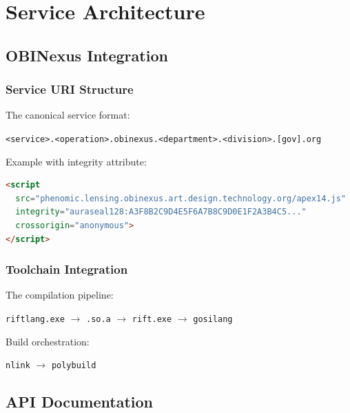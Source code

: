 \documentclass[12pt,a4paper]{report}
\theoremstyle{definition}
\begin{document}

\part{Service Architecture}

\chapter{OBINexus Integration}

\section{Service URI Structure}

The canonical service format:

\begin{center}
\texttt{<service>.<operation>.obinexus.<department>.<division>.[gov].org}
\end{center}

Example with integrity attribute:

\begin{lstlisting}[language=HTML, caption=Service Integration]
<script 
  src="phenomic.lensing.obinexus.art.design.technology.org/apex14.js"
  integrity="auraseal128:A3F8B2C9D4E5F6A7B8C9D0E1F2A3B4C5..."
  crossorigin="anonymous">
</script>
\end{lstlisting}

\section{Toolchain Integration}

The compilation pipeline:

\begin{center}
\texttt{riftlang.exe} $\rightarrow$ \texttt{.so.a} $\rightarrow$ \texttt{rift.exe} $\rightarrow$ \texttt{gosilang}
\end{center}

Build orchestration:

\begin{center}
\texttt{nlink} $\rightarrow$ \texttt{polybuild}
\end{center}

\chapter{API Documentation}
\end{document}
